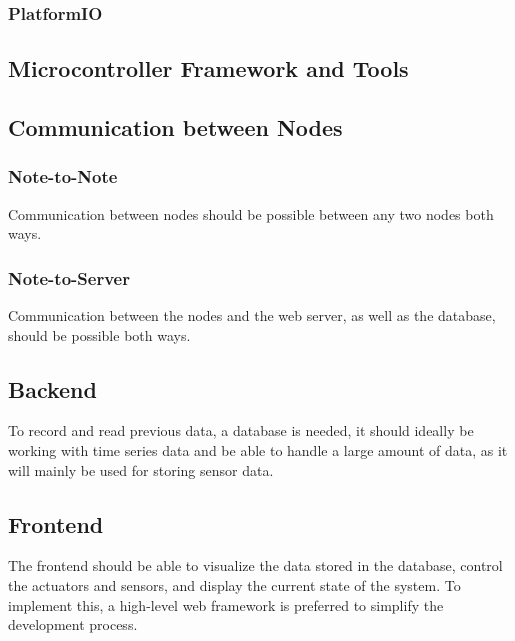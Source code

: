             \subsubsection{PlatformIO}

        \subsection{Microcontroller Framework and Tools}

        \subsection{Communication between Nodes}
        
            \subsubsection{Note-to-Note}
            Communication between nodes should be possible between any two nodes
            both ways.

            \subsubsection{Note-to-Server}
            Communication between the nodes and the web server, as well as the 
            database, should be possible both ways.

        \subsection{Backend}
        To record and read previous data, a database is needed, it should ideally be 
        working with time series data and be able to handle a large amount of data, 
        as it will mainly be used for storing sensor data.

        \subsection{Frontend}
        The frontend should be able to visualize the data stored in the database,
        control the actuators and sensors, and display the current state of the 
        system. To implement this, a high-level web framework is preferred to 
        simplify the development process. 